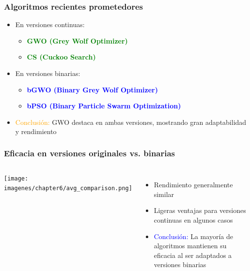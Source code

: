 \begin{frame}
    \frametitle{Algoritmos recientes prometedores}
    \begin{itemize}
        \item<1-> En versiones continuas:
            \begin{itemize}
                \item \textcolor{green}{\textbf{GWO (Grey Wolf Optimizer)}}
                \item \textcolor{green}{\textbf{CS (Cuckoo Search)}}
            \end{itemize}
        \item<2-> En versiones binarias:
            \begin{itemize}
                \item \textcolor{blue}{\textbf{bGWO (Binary Grey Wolf Optimizer)}}
                \item \textcolor{blue}{\textbf{bPSO (Binary Particle Swarm Optimization)}}
            \end{itemize}
        \item<3-> \textcolor{orange}{Conclusión:} GWO destaca en ambas versiones, mostrando gran adaptabilidad y rendimiento
    \end{itemize}
\end{frame}

\begin{frame}
    \frametitle{Eficacia en versiones originales vs. binarias}
    \begin{columns}
        \texttt{[image: imagenes/chapter6/avg\_comparison.png]}
        \begin{itemize}
            \item<1-> Rendimiento generalmente similar
            \item<2-> Ligeras ventajas para versiones continuas en algunos casos
            \item<3-> \textcolor{blue}{Conclusión:} La mayoría de algoritmos mantienen su eficacia al ser adaptados a versiones binarias
        \end{itemize}
    \end{columns}
\end{frame}

